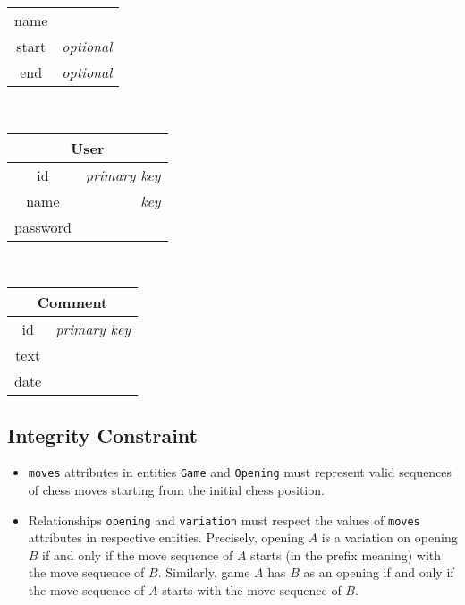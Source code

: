 \documentclass{article}
\begin{document}
\begin{table}[ht!]
\begin{subtable}{3.5cm}
\begin{tabular}[t]{|cr|}
	\hline
	name   &                  \\
	start  & \em{optional}    \\
	end    & \em{optional}    \\
	\hline
	\end{tabular}
    \end{subtable}
    ~
    \begin{subtable}{3.5cm}
	\begin{tabular}[t]{|cr|}
	\hline
	\multicolumn{2}{|c|}{\textbf{User}} \\
	\hline
	id       & \em{primary key} \\
	name     & \em{key}         \\
	password &                  \\
	\hline
	\end{tabular}
    \end{subtable}
    ~
    \begin{subtable}{3.5cm}
	\begin{tabular}[t]{|cr|}
	\hline
	\multicolumn{2}{|c|}{\textbf{Comment}} \\
	\hline
	id     & \em{primary key} \\
	text   &                  \\
	date   &                  \\
	\hline
	\end{tabular}
    \end{subtable}
\end{table}


\subsection{Integrity Constraint}
\begin{itemize}
\item \verb|moves| attributes in entities \verb|Game| and \verb|Opening| must represent
valid sequences of chess moves starting from the initial chess position.

\item Relationships \verb|opening| and \verb|variation| must respect the values of \verb|moves|
attributes in respective entities.
Precisely, opening $A$ is a variation on opening $B$ if and only if the move sequence
of $A$ starts (in the prefix meaning) with the move sequence of $B$.
Similarly, game $A$ has $B$ as an opening if and only if the move sequence of $A$ starts
with the move sequence of $B$.
\end{itemize}
\end{document}
